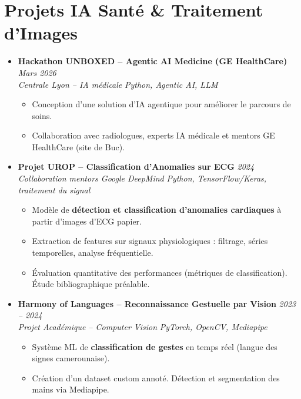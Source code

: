 \documentclass[a4paper,11pt]{article}
\begin{document}
\section{Projets IA Santé \& Traitement d'Images}
\begin{itemize}[leftmargin=*, label={-}]

\item \textbf{Hackathon UNBOXED -- Agentic AI Medicine (GE HealthCare)} \hfill \textit{Mars 2026} \\
\textit{Centrale Lyon -- IA médicale} \hfill \textit{Python, Agentic AI, LLM}
\vspace{-2pt}
    \begin{itemize}[leftmargin=0.4cm, nosep, label=\tiny$\bullet$]
        \item \small{Conception d'une solution d'IA agentique pour améliorer le parcours de soins.}
        \item \small{Collaboration avec radiologues, experts IA médicale et mentors GE HealthCare (site de Buc).}
    \end{itemize}
\vspace{3pt}

\item \textbf{Projet UROP -- Classification d'Anomalies sur ECG} \hfill \textit{2024} \\
\textit{Collaboration mentors Google DeepMind} \hfill \textit{Python, TensorFlow/Keras, traitement du signal}
\vspace{-2pt}
    \begin{itemize}[leftmargin=0.4cm, nosep, label=\tiny$\bullet$]
        \item \small{Modèle de \textbf{détection et classification d'anomalies cardiaques} à partir d'images d'ECG papier.}
        \item \small{Extraction de features sur signaux physiologiques : filtrage, séries temporelles, analyse fréquentielle.}
        \item \small{Évaluation quantitative des performances (métriques de classification). Étude bibliographique préalable.}
    \end{itemize}
\vspace{3pt}

\item \textbf{Harmony of Languages -- Reconnaissance Gestuelle par Vision} \hfill \textit{2023 -- 2024} \\
\textit{Projet Académique -- Computer Vision} \hfill \textit{PyTorch, OpenCV, Mediapipe}
\vspace{-2pt}
    \begin{itemize}[leftmargin=0.4cm, nosep, label=\tiny$\bullet$]
        \item \small{Système ML de \textbf{classification de gestes} en temps réel (langue des signes camerounaise).}
        \item \small{Création d'un dataset custom annoté. Détection et segmentation des mains via Mediapipe.}
    \end{itemize}
\vspace{3pt}


\end{itemize}
\end{document}
